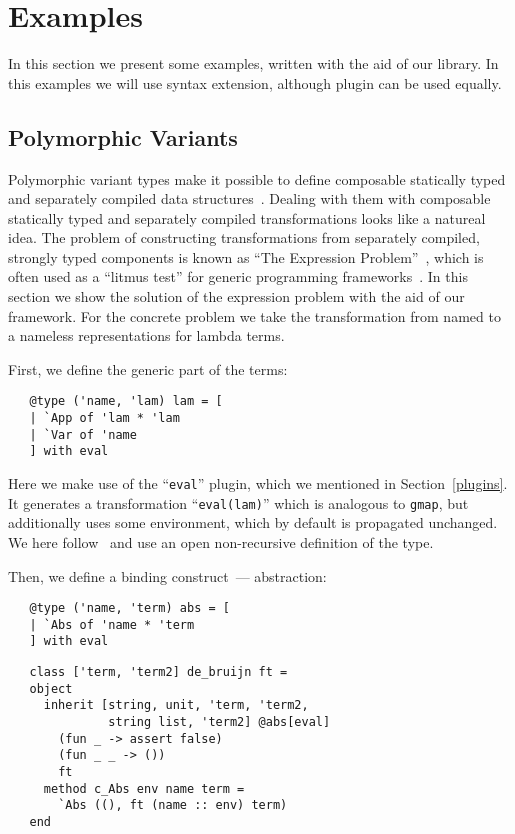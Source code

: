 \section{Examples}

In this section we present some examples, written with the aid of our library. In this examples we will use  syntax extension,
although  plugin can be used equally.


\subsection{Polymorphic Variants}

Polymorphic variant types make it possible to define composable statically typed and separately compiled data structures~\cite{PolyVarReuse}.
Dealing with them with composable statically typed and separately compiled transformations looks like a natureal idea. The problem of
constructing transformations from separately compiled, strongly typed components is known as ``The Expression Problem''~\cite{ExpressionProblem}, which
is often used as a ``litmus test'' for generic programming frameworks~\cite{ObjectAlgebras,ALaCarte}. In this section we show the solution of
the expression problem with the aid of our framework. For the concrete problem we take the transformation from named to a nameless representations
for lambda terms.

First, we define the generic part of the terms:

\begin{lstlisting}
   @type ('name, 'lam) lam = [
   | `App of 'lam * 'lam
   | `Var of 'name
   ] with eval
\end{lstlisting}

Here we make use of the ``\lstinline{eval}'' plugin, which we mentioned in Section~\ref{plugins}. It generates a transformation ``\lstinline{eval(lam)}''
which is analogous to \lstinline{gmap}, but additionally uses some environment, which by default is propagated unchanged. We here follow~\cite{PolyVarReuse}
and use an open non-recursive definition of the type.

Then, we define a binding construct~--- abstraction:

\begin{lstlisting}
   @type ('name, 'term) abs = [
   | `Abs of 'name * 'term
   ] with eval
\end{lstlisting}
 
\begin{lstlisting}
   class ['term, 'term2] de_bruijn ft =
   object
     inherit [string, unit, 'term, 'term2,
              string list, 'term2] @abs[eval]
       (fun _ -> assert false)
       (fun _ _ -> ())
       ft
     method c_Abs env name term =
       `Abs ((), ft (name :: env) term)
   end
\end{lstlisting}

